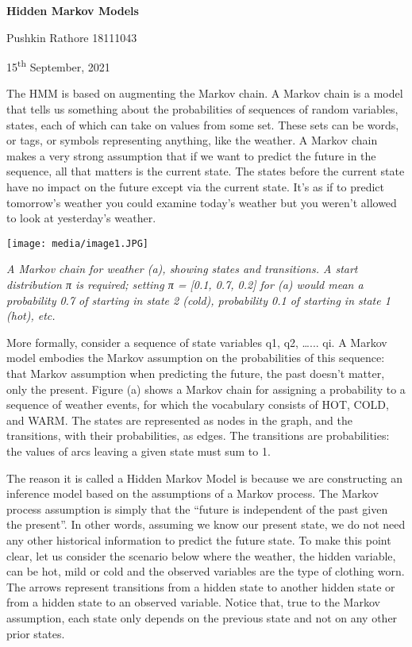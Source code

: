 \documentclass[]{article}
\date{}
\begin{document}
\textbf{Hidden Markov Models}

Pushkin Rathore 18111043

15\textsuperscript{th} September, 2021

The HMM is based on augmenting the Markov chain. A Markov chain is a
model that tells us something about the probabilities of sequences of
random variables, states, each of which can take on values from some
set. These sets can be words, or tags, or symbols representing anything,
like the weather. A Markov chain makes a very strong assumption that if
we want to predict the future in the sequence, all that matters is the
current state. The states before the current state have no impact on the
future except via the current state. It's as if to predict tomorrow's
weather you could examine today's weather but you weren't allowed to
look at yesterday's weather.

\texttt{[image: media/image1.JPG]}

\emph{A Markov chain for weather (a), showing states and transitions. A
start distribution π is required; setting π = {[}0.1, 0.7, 0.2{]} for
(a) would mean a probability 0.7 of starting in state 2 (cold),
probability 0.1 of starting in state 1 (hot), etc.}

More formally, consider a sequence of state variables q1, q2,
\ldots{}... qi. A Markov model embodies the Markov assumption on the
probabilities of this sequence: that Markov assumption when predicting
the future, the past doesn't matter, only the present. Figure (a) shows
a Markov chain for assigning a probability to a sequence of weather
events, for which the vocabulary consists of HOT, COLD, and WARM. The
states are represented as nodes in the graph, and the transitions, with
their probabilities, as edges. The transitions are probabilities: the
values of arcs leaving a given state must sum to 1.

The reason it is called a Hidden Markov Model is because we are
constructing an inference model based on the assumptions of a Markov
process. The Markov process assumption is simply that the ``future is
independent of the past given the present''. In other words, assuming we
know our present state, we do not need any other historical information
to predict the future state. To make this point clear, let us consider
the scenario below where the weather, the hidden variable, can be hot,
mild or cold and the observed variables are the type of clothing worn.
The arrows represent transitions from a hidden state to another hidden
state or from a hidden state to an observed variable. Notice that, true
to the Markov assumption, each state only depends on the previous state
and not on any other prior states.
\end{document}
